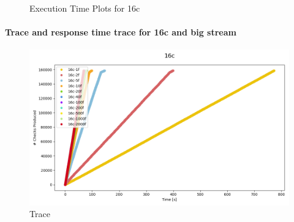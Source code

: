 \documentclass[12pt,a4paper]{article}
\begin{document}
\begin{figure}[H]
    \vspace{0.5cm} %


    \caption{Execution Time Plots for 16c}
    \label{img:exps-read-input-variants}
\end{figure}

\paragraph{Trace and response time trace for 16c and big stream\\}
\newpage

\begin{figure}[H]
    \centering
    \includegraphics[scale=0.5]{../processed/NRT/small/checks/120-0.02/fixedcores/16c/plots/traces.png}
    \caption*{Trace}
\end{figure}
\end{document}
